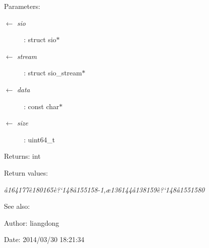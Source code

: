\begin{Desc}
\item[Parameters:]
\begin{description}
\item[\mbox{$\leftarrow$} {\em sio}]: struct sio$\ast$ \item[\mbox{$\leftarrow$} {\em stream}]: struct sio\_\-stream$\ast$ \item[\mbox{$\leftarrow$} {\em data}]: const char$\ast$ \item[\mbox{$\leftarrow$} {\em size}]: uint64\_\-t \end{description}
\end{Desc}
\begin{Desc}
\item[Returns:]int \end{Desc}
\begin{Desc}
\item[Return values:]
\begin{description}
\item[{\em \aa{}164177\`{e}180165\`{e}?`148\aa{}155158-1,\ae{}136144\aa{}138159\`{e}?`148\aa{}1551580}]\end{description}
\end{Desc}
\begin{Desc}
\item[See also:]\end{Desc}
\begin{Desc}
\item[Author:]liangdong \end{Desc}
\begin{Desc}
\item[Date:]2014/03/30 18:21:34 \end{Desc}
